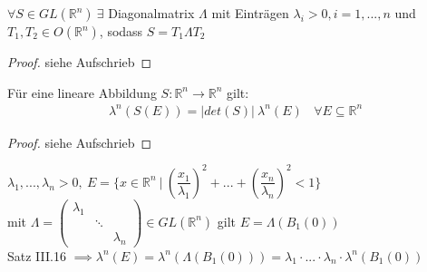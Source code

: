 \documentclass[11pt,a4paper,fleqn,openany]{report}
\begin{document}
    \begin{lemma}[Polarzerlegung]
      $\forall S \in GL(\mathbb{R}^n) \ \exists$ Diagonalmatrix $\Lambda$ mit Einträgen $\lambda_i > 0, i=1,...,n$ und \\
      $T_1, T_2 \in O(\mathbb{R}^n)$, sodass $S = T_1 \Lambda T_2$ 
    \end{lemma}

    \begin{proof}
      siehe Aufschrieb
    \end{proof}

    \begin{theorem}
      Für eine lineare Abbildung $S: \mathbb{R}^n \to \mathbb{R}^n$ gilt:
      \begin{align*}
        \lambda^n(S(E)) = |det(S)| \ \lambda^n(E) \ \ \ \ \forall E \subseteq \mathbb{R}^n
      \end{align*}
    \end{theorem}

    \begin{proof}
      siehe Aufschrieb
    \end{proof}

    \begin{example}
    \begin{minipage}{0.7\textwidth}
      $\lambda_1, ...,  \lambda_n > 0, \ E=\{x \in \mathbb{R}^n \ | \ (\dfrac{x_1}{\lambda_1})^2 + ... + (\dfrac{x_n}{\lambda_n})^2 < 1\}$\\
      mit $\Lambda = \begin{pmatrix}
        \lambda_1 & &\\
        & \ddots &\\
        & & \lambda_n
      \end{pmatrix}
      \in GL(\mathbb{R}^n)$ gilt $E = \Lambda(B_1(0))$\\
      Satz III.16 $\implies \lambda^n(E) = \lambda^n(\Lambda(B_1(0))) = \lambda_1 \cdot ... \cdot \lambda_n \cdot \lambda^n(B_1(0))$
    \end{minipage}\hfill
    \begin{minipage}{0.3\textwidth}
    \end{minipage}
    \end{example}
\end{document}

